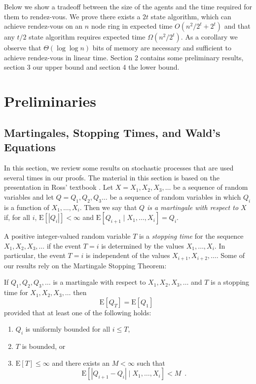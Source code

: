 \documentclass[lotsofwhite]{patmorin}
\newcommand{\E}{\mathrm{E}}
\begin{document}
Below we show a tradeoff between the size of the agents and the time
required for them to rendez-vous. We prove there exists a $2t$ state
algorithm,   
which can achieve rendez-vous on an $n$ node ring in expected
time $O(n^2/2^{t} + 2^{t} )$ and that any $t/2$ state algorithm
requires expected time $\Omega( n^2/2^t )$.  As a corollary we observe
that $\Theta(\log \log n)$ bits of memory are necessary and sufficient
to achieve rendez-vous in linear time.  Section 2 contains some
preliminary results, section 3 our upper bound and section 4 the lower
bound. 


\section{Preliminaries}

\subsection{Martingales, Stopping Times, and Wald's Equations}

In this section, we review some results on stochastic processes that
are used several times in our proofs.  The material in this section is
based on the presentation in Ross' textbook \cite[Chapter 6]{ross}.
Let $X=X_1,X_2,X_3,\ldots$ be a sequence of random variables and let
$Q=Q_1,Q_2,Q_3\ldots$ be a sequence of random variables in which $Q_i$
is a function of $X_1,\ldots,X_i$.  Then we say that \emph{$Q$ is a
martingale with respect to $X$} if, for all $i$, $\E[|Q_i|] < \infty$
and $\E[Q_{i+1}\mid X_1,\ldots,X_i] = Q_i$.

A positive integer-valued random variable $T$ is a \emph{stopping
time} for the sequence $X_1,X_2,X_3,\ldots$ if the event $T=i$ is
determined by the values $X_1,\ldots,X_i$.  In particular, the event
$T=i$ is independent of the values $X_{i+1},X_{i+2},\ldots$.  Some of
our results rely on the Martingale Stopping Theorem:

\begin{thm}
If $Q_1,Q_2,Q_3,\ldots$ is a martingale with respect to
$X_1,X_2,X_3,\ldots$ and $T$ is a stopping time for
$X_1,X_2,X_3,\ldots$ then
\[
   \E[Q_T] = \E[Q_1] \enspace 
\]
provided that at least one of the following holds:
\begin{enumerate}
\item $Q_i$ is uniformly bounded for all $i\le T$,
\item $T$ is bounded, or
\item $\E[T]\le \infty$ and there exists an $M<\infty$ such that
\[ \E\left[|Q_{i+1}-Q_i| \mid X_1,\ldots,X_i \right] < M  \enspace . \]
\end{enumerate}
\end{thm}
\end{document}

